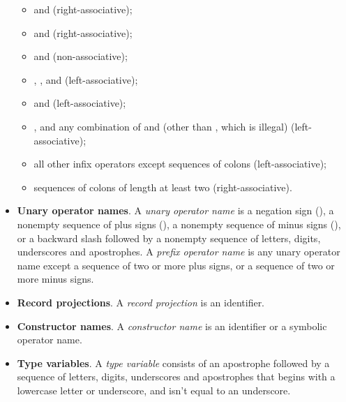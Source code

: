 \begin{itemize}
\begin{itemize}
  \item \ecnocolors{||} and \ecnocolors{\\/} (right-associative);

  \item \ecnocolors{&&} and \ecnocolors{/\\} (right-associative);

  \item \ecnocolors{=} and \ecnocolors{<>} (non-associative);

  \item \ecnocolors{<}, \ecnocolors{>}, \ecnocolors{<=} and \ecnocolors{>=}
    (left-associative);

  \item \ecnocolors{-} and \ecnocolors{+} (left-associative);

  \item \ecnocolors{*}, and any combination of \ecnocolors{/} and
    \ecnocolors{\%} (other than \ecnocolors{//}, which is illegal)
    (left-associative);

  \item all other infix operators except sequences of colons
    (left-associative);

  \item sequences of colons of length at least two (right-associative).
  \end{itemize}

\item \textbf{Unary operator names}. A \emph{unary operator name} is a
  negation sign (\ec{!}), a nonempty sequence of plus signs (\ec{+}),
  a nonempty sequence of minus signs (\ec{-}), or a backward slash
  followed by a nonempty sequence of letters, digits, underscores and
  apostrophes.  A \emph{prefix operator name} is any unary operator
  name except a sequence of two or more plus signs, or a sequence of
  two or more minus signs.

\item \textbf{Record projections}. A \emph{record projection} is an
  identifier.

\item \textbf{Constructor names}. A \emph{constructor name} is an identifier
  or a symbolic operator name.

\item \textbf{Type variables}. A \emph{type variable} consists of an
  apostrophe followed by a sequence of letters, digits, underscores
  and apostrophes that begins with a lowercase letter or underscore,
  and isn't equal to an underscore.


\end{itemize}

